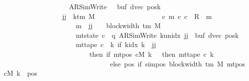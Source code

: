 \begin{isabellebody}
\ \ \ \ \ \ \ \ \ \ \ \ \ \ \ \ \ \ \ {\isacharparenleft}{\kern0pt}AR{\isacharunderscore}{\kern0pt}SimWrite{\isacharcomma}{\kern0pt}\ {}{\isacharcomma}{\kern0pt}\ {}{\isacharcomma}{\kern0pt}\ buf{\isacharcomma}{\kern0pt}\ dvec{\isacharcomma}{\kern0pt}\ posk{\isacharparenright}{\kern0pt}{\isacharsemicolon}{\kern0pt}\isanewline
\ \ \ \ \ \ \ \ \ \ \ \ \ \ \ \ \ jj\ {\isasymle}\ k{\isacharunderscore}{\kern0pt}tm\ M\ {\isacharminus}{\kern0pt}\ {}\ {\isasymrbrakk}\isanewline
\ \ \ \ \ \ \ \ \ \ \ \ \ \ \ {\isasymLongrightarrow}\ {\isacharparenleft}{\kern0pt}{\isasymexists}c\ m{\isachardot}{\kern0pt}\ {\isacharparenleft}{\kern0pt}c{}{\isacharcomma}{\kern0pt}\ c{\isacharparenright}{\kern0pt}\ {\isasymin}\ R{\isacharprime}{\kern0pt}\ {\isacharcircum}{\kern0pt}{\isacharcircum}{\kern0pt}\ m\isanewline
\ \ \ \ \ \ \ \ \ \ \ \ \ \ \ \ \ \ \ \ {\isasymand}\ m\ {\isasymle}\ jj\ {\isacharasterisk}{\kern0pt}\ {\isacharparenleft}{\kern0pt}{}\ {\isacharasterisk}{\kern0pt}\ block{\isacharunderscore}{\kern0pt}width\ {\isacharparenleft}{\kern0pt}{\isasymGamma}{\isacharunderscore}{\kern0pt}tm\ M{\isacharparenright}{\kern0pt}{\isacharparenright}{\kern0pt}\isanewline
\ \ \ \ \ \ \ \ \ \ \ \ \ \ \ \ \ \ \ \ {\isasymand}\ mt{\isacharunderscore}{\kern0pt}state\ c\ {\isacharequal}{\kern0pt}\ {\isacharparenleft}{\kern0pt}q{\isacharcomma}{\kern0pt}\ AR{\isacharunderscore}{\kern0pt}SimWrite{\isacharcomma}{\kern0pt}\ k{\isacharunderscore}{\kern0pt}unidx\ jj{\isacharcomma}{\kern0pt}\ {}{\isacharcomma}{\kern0pt}\ buf{\isacharcomma}{\kern0pt}\ dvec{\isacharcomma}{\kern0pt}\ posk{\isacharparenright}{\kern0pt}\isanewline
\ \ \ \ \ \ \ \ \ \ \ \ \ \ \ \ \ \ \ \ {\isasymand}\ mt{\isacharunderscore}{\kern0pt}tape\ c\ {\isacharequal}{\kern0pt}\ {\isacharparenleft}{\kern0pt}{\isasymlambda}k{\isachardot}{\kern0pt}\ if\ k{\isacharunderscore}{\kern0pt}idx\ k\ {\isacharless}{\kern0pt}\ jj\isanewline
\ \ \ \ \ \ \ \ \ \ \ \ \ \ \ \ \ \ \ \ \ \ \ \ \ then\ {\isacharparenleft}{\kern0pt}if\ mt{\isacharunderscore}{\kern0pt}pos\ cM\ k\ {\isacharequal}{\kern0pt}\ {}\ then\ mt{\isacharunderscore}{\kern0pt}tape\ c{}\ k\isanewline
\ \ \ \ \ \ \ \ \ \ \ \ \ \ \ \ \ \ \ \ \ \ \ \ \ \ \ \ \ \ \ else\ {\isacharparenleft}{\kern0pt}{\isasymlambda}pos{\isachardot}{\kern0pt}\ if\ sim{\isacharunderscore}{\kern0pt}pos\ {\isacharparenleft}{\kern0pt}block{\isacharunderscore}{\kern0pt}width\ {\isacharparenleft}{\kern0pt}{\isasymGamma}{\isacharunderscore}{\kern0pt}tm\ M{\isacharparenright}{\kern0pt}{\isacharparenright}{\kern0pt}\ {\isacharparenleft}{\kern0pt}mt{\isacharunderscore}{\kern0pt}pos\ cM\ k{\isacharparenright}{\kern0pt}\ {\isasymle}\ pos\isanewline

\end{isabellebody}
